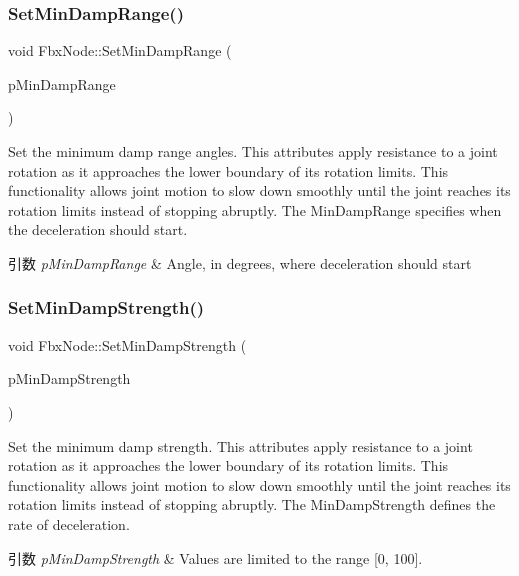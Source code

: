 \subsubsection{\texorpdfstring{Set\+Min\+Damp\+Range()}{SetMinDampRange()}}
{\footnotesize\ttfamily void Fbx\+Node\+::\+Set\+Min\+Damp\+Range (\begin{DoxyParamCaption}\item[{\hyperlink{class_fbx_vector4}{Fbx\+Vector4}}]{p\+Min\+Damp\+Range }\end{DoxyParamCaption})}

Set the minimum damp range angles. This attributes apply resistance to a joint rotation as it approaches the lower boundary of its rotation limits. This functionality allows joint motion to slow down smoothly until the joint reaches its rotation limits instead of stopping abruptly. The Min\+Damp\+Range specifies when the deceleration should start. 
\begin{DoxyParams}{引数}
{\em p\+Min\+Damp\+Range} & Angle, in degrees, where deceleration should start \\
\hline
\end{DoxyParams}
\mbox{\label{class_fbx_node_a5723a65d1841667ced97cbdbb106c740}} 
\subsubsection{\texorpdfstring{Set\+Min\+Damp\+Strength()}{SetMinDampStrength()}}
{\footnotesize\ttfamily void Fbx\+Node\+::\+Set\+Min\+Damp\+Strength (\begin{DoxyParamCaption}\item[{\hyperlink{class_fbx_vector4}{Fbx\+Vector4}}]{p\+Min\+Damp\+Strength }\end{DoxyParamCaption})}

Set the minimum damp strength. This attributes apply resistance to a joint rotation as it approaches the lower boundary of its rotation limits. This functionality allows joint motion to slow down smoothly until the joint reaches its rotation limits instead of stopping abruptly. The Min\+Damp\+Strength defines the rate of deceleration. 
\begin{DoxyParams}{引数}
{\em p\+Min\+Damp\+Strength} & Values are limited to the range \mbox{[}0, 100\mbox{]}. \\
\hline
\end{DoxyParams}
\mbox{\label{class_fbx_node_adb194a043dd1ccf3bc1e3bda520dc97a}} 
